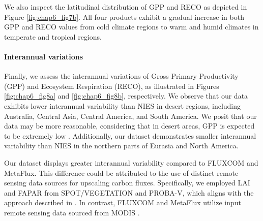 We also inspect the latitudinal distribution of GPP and RECO as depicted in Figure \ref{fig:chap6_fig7b}. All four products exhibit a gradual increase in both GPP and RECO values from cold climate regions to warm and humid climates in temperate and tropical regions. \par
\paragraph*{Interannual variations}
Finally, we assess the interannual variations of Gross Primary Productivity (GPP) and Ecosystem Respiration (RECO), as illustrated in Figures \ref{fig:chap6_fig8a} and \ref{fig:chap6_fig8b}, respectively. We observe that our data exhibits lower interannual variability than NIES in desert regions, including Australia, Central Asia, Central America, and South America. We posit that our data may be more reasonable, considering that in desert areas, GPP is expected to be extremely low \citep{hadley1981productivity}. Additionally, our dataset demonstrates smaller interannual variability than NIES in the northern parts of Eurasia and North America. \par
Our dataset displays greater interannual variability compared to FLUXCOM and MetaFlux. This difference could be attributed to the use of distinct remote sensing data sources for upscaling carbon fluxes. Specifically, we employed LAI and FAPAR from SPOT/VEGETATION and PROBA-V, which aligns with the approach described in \citep{zeng2020global}. In contrast, FLUXCOM and MetaFlux utilize input remote sensing data sourced from MODIS \citep{jung2019fluxcom, nathaniel2023metaflux}. \par
